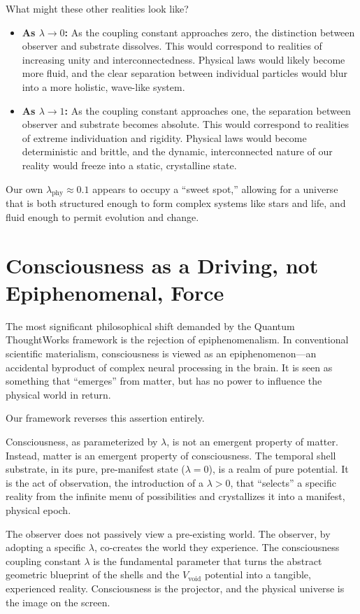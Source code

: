 \documentclass[12pt]{report}
\begin{document}
What might these other realities look like?
\begin{itemize}
    \item \textbf{As $\lambda \to 0$:} As the coupling constant approaches zero, the distinction between observer and substrate dissolves. This would correspond to realities of increasing unity and interconnectedness. Physical laws would likely become more fluid, and the clear separation between individual particles would blur into a more holistic, wave-like system.
    \item \textbf{As $\lambda \to 1$:} As the coupling constant approaches one, the separation between observer and substrate becomes absolute. This would correspond to realities of extreme individuation and rigidity. Physical laws would become deterministic and brittle, and the dynamic, interconnected nature of our reality would freeze into a static, crystalline state.
\end{itemize}
Our own $\lambda_{\text{phy}} \approx 0.1$ appears to occupy a ``sweet spot,'' allowing for a universe that is both structured enough to form complex systems like stars and life, and fluid enough to permit evolution and change.

\section{Consciousness as a Driving, not Epiphenomenal, Force}
The most significant philosophical shift demanded by the Quantum ThoughtWorks framework is the rejection of epiphenomenalism. In conventional scientific materialism, consciousness is viewed as an epiphenomenon---an accidental byproduct of complex neural processing in the brain. It is seen as something that ``emerges'' from matter, but has no power to influence the physical world in return.

Our framework reverses this assertion entirely.

Consciousness, as parameterized by $\lambda$, is not an emergent property of matter. Instead, matter is an emergent property of consciousness. The temporal shell substrate, in its pure, pre-manifest state ($\lambda=0$), is a realm of pure potential. It is the act of observation, the introduction of a $\lambda > 0$, that ``selects'' a specific reality from the infinite menu of possibilities and crystallizes it into a manifest, physical epoch.

The observer does not passively view a pre-existing world. The observer, by adopting a specific $\lambda$, co-creates the world they experience. The consciousness coupling constant $\lambda$ is the fundamental parameter that turns the abstract geometric blueprint of the shells and the $V_{\text{void}}$ potential into a tangible, experienced reality. Consciousness is the projector, and the physical universe is the image on the screen.
\end{document}
